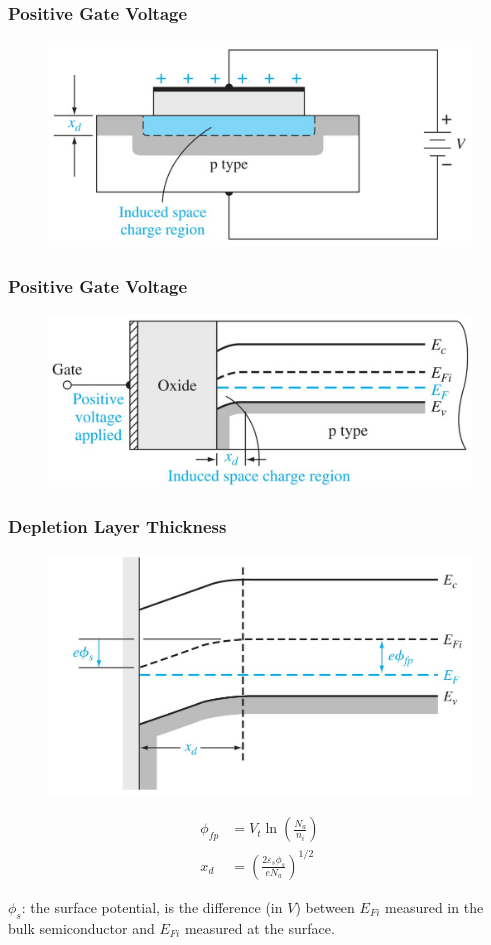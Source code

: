 \documentclass{beamer}
\begin{document}
    \begin{frame} \frametitle{Positive Gate Voltage}
        \begin{figure}[H]
            \centering
            \includegraphics[width=0.6\linewidth]{PMOS-positive-gate-voltage.jpg}
            \label{fig:PMOS-positive-gate-voltage.jpg}
        \end{figure}
    \end{frame}
    \begin{frame} \frametitle{Positive Gate Voltage}
        \begin{figure}[H]
            \centering
            \includegraphics[width=0.6\linewidth]{PMOS-positive-gate-voltage-energy-band-diagram.jpg}
            \label{fig:PMOS-positive-gate-voltage-energy-band-diagram.jpg}
        \end{figure}
    \end{frame}

    \begin{frame} \frametitle{Depletion Layer Thickness}
        \begin{figure}[H]
            \centering
            \includegraphics[width=0.6\linewidth]{Energy-band-diagram-PMOS-and-surface-potential.jpg}
            \label{fig:Energy-band-diagram-PMOS-and-surface-potential.jpg}
        \end{figure}
        \begin{equation*}
            \begin{aligned}
                \phi_{fp} &= V_t \ln \left( \frac{N_a}{n_i}  \right) \\
                x_d &= \left( \frac{2 \varepsilon_s \phi_s}{e N_a}  \right)^{1/2} 
            \end{aligned}
        \end{equation*}
        \par $\phi_s$: the surface potential, is the difference (in $V$) between $E_{Fi}$ measured in the bulk semiconductor and $E_{Fi} $ measured at the surface.
    \end{frame}
\end{document}
